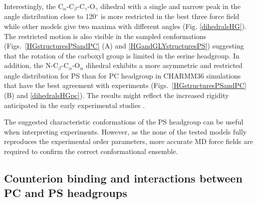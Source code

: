 \documentclass[aps,prl,superscriptaddress,twocolumn]{revtex4}
\begin{document}
Interestingly, the C$_\alpha$-C$_\beta$-C$_\gamma$-O$_\gamma$  dihedral with
a single and narrow peak in the angle distribution close to 120$^{\circ}$ is more restricted
in the best three force field while other models give two maxima with different angles (Fig. \ref{dihedralsHG}).
The restricted motion is also visible in the sampled conformations (Figs.~\ref{HGstructuresPSandPC} (A) and \ref{HGandGLYstructuresPS})
suggesting that the rotation of the carboxyl group is limited in the serine headgroup.
In addition, the N-C$_\beta$-C$_\alpha$-O$_\alpha$ dihedral exhibits a more asymmetric
and restricted angle distribution for PS than for PC headgroup in
CHARMM36 simulations that have the best agreement with experiments
(Figs.~\ref{HGstructuresPSandPC} (B) and \ref{dihedralsHGpc}).
The results might reflect the increased rigidity anticipated in the early experimental studies \cite{browning80,buldt81}. %

The suggested characteristic conformations of the PS headgroup can be useful when interpreting experiments. However, as the none of the tested models fully reproduces the experimental order parameters, more accurate MD force fields are required to confirm the correct conformational ensemble.



\subsection{Counterion binding and interactions between PC and PS headgroups}\label{ciBINDINGsection}
\end{document}
